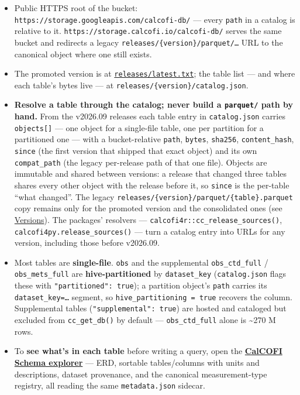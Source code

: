 \documentclass[
  letterpaper,
  DIV=11,
  numbers=noendperiod]{scrreprt}
\providecommand{\tightlist}{%
  \setlength{\itemsep}{0pt}\setlength{\parskip}{0pt}}
\begin{document}
\begin{itemize}
\tightlist
\item
  Public HTTPS root of the bucket:
  \texttt{https://storage.googleapis.com/calcofi-db/} --- every
  \texttt{path} in a catalog is relative to it.
  \texttt{https://storage.calcofi.io/calcofi-db/} serves the same bucket
  and redirects a legacy \texttt{releases/\{version\}/parquet/…} URL to
  the canonical object where one still exists.
\item
  The promoted version is at
  \href{https://storage.googleapis.com/calcofi-db/ducklake/releases/latest.txt}{\texttt{releases/latest.txt}};
  the table list --- and where each table's bytes live --- at
  \texttt{releases/\{version\}/catalog.json}.
\item
  \textbf{Resolve a table through the catalog; never build a
  \texttt{parquet/} path by hand.} From the v2026.09 releases each table
  entry in \texttt{catalog.json} carries \texttt{objects{[}{]}} --- one
  object for a single-file table, one per partition for a partitioned
  one --- with a bucket-relative \texttt{path}, \texttt{bytes},
  \texttt{sha256}, \texttt{content\_hash}, \texttt{since} (the first
  version that shipped that exact object) and its own
  \texttt{compat\_path} (the legacy per-release path of that one file).
  Objects are immutable and shared between versions: a release that
  changed three tables shares every other object with the release before
  it, so \texttt{since} is the per-table ``what changed''. The legacy
  \texttt{releases/\{version\}/parquet/\{table\}.parquet} copy remains
  only for the promoted version and the consolidated ones (see
  \hyperref[sec-versions]{Versions}). The packages' resolvers ---
  \texttt{calcofi4r::cc\_release\_sources()},
  \texttt{calcofi4py.release\_sources()} --- turn a catalog entry into
  URLs for any version, including those before v2026.09.
\item
  Most tables are \textbf{single-file}. \texttt{obs} and the
  supplemental \texttt{obs\_ctd\_full} / \texttt{obs\_mets\_full} are
  \textbf{hive-partitioned} by \texttt{dataset\_key}
  (\texttt{catalog.json} flags these with
  \texttt{"partitioned":\ true}); a partition object's \texttt{path}
  carries its \texttt{dataset\_key=…} segment, so
  \texttt{hive\_partitioning\ =\ true} recovers the column. Supplemental
  tables (\texttt{"supplemental":\ true}) are hosted and cataloged but
  excluded from \texttt{cc\_get\_db()} by default ---
  \texttt{obs\_ctd\_full} alone is \textasciitilde270 M rows.
\item
  To \textbf{see what's in each table} before writing a query, open the
  \href{https://calcofi.io/db-schema/}{\textbf{CalCOFI Schema explorer}}
  --- ERD, sortable tables/columns with units and descriptions, dataset
  provenance, and the canonical measurement-type registry, all reading
  the same \texttt{metadata.json} sidecar.
\end{itemize}
\end{document}
